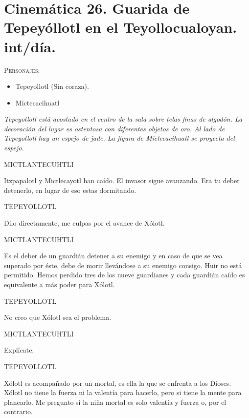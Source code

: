 \documentclass[11pt,letterpaper]{article}
\begin{document}
\section{Cinemática 26. Guarida de Tepeyóllotl en el Teyollocualoyan. int/día.}
 \textsc{Personajes}:
 \begin{itemize}
 \item Tepeyollotl (Sin coraza).
\item Mictecacihuatl
 \end{itemize}
\textit{Tepeyollotl está acostado en el centro de la sala sobre telas finas de algodón. La decoración del lugar es ostentosa con diferentes objetos de oro. Al lado de Tepeyollotl hay un espejo de jade. La figura de   Mictecacihuatl se proyecta del espejo.}
\begin{center}
MICTLANTECUHTLI
\\
\par
Itzpapalotl y Mictlecayotl han caído. El invasor sigue avanzando. Era tu deber detenerlo, en lugar de eso estas dormitando.
\\
\par
TEPEYOLLOTL
\\
\par
Dilo directamente, me culpas por el avance de Xólotl.
\\
\par
MICTLANTECUHTLI
\\
\par
Es el deber de un guardián detener a su enemigo y en caso de que se vea superado por éste, debe de morir llevándose a su enemigo consigo. Huir no está permitido. Hemos perdido tres de los nueve guardianes y cada guardián caído es equivalente a más poder para Xólotl.
\\
\par
TEPEYOLLOTL
\\
\par
No creo que Xólotl sea el problema.
\\
\par
MICTLANTECUHTLI
\\
\par
Explícate.
\\
\par
TEPEYOLLOTL
\\
\par
Xólotl es acompañado por un mortal, es ella la que se enfrenta a los Dioses. Xólotl no tiene la fuerza ni la valentía para hacerlo, pero si tiene la mente para planearlo. Me pregunto si la niña mortal es solo valentía y fuerza o, por el contrario.

\end{center}
\end{document}
